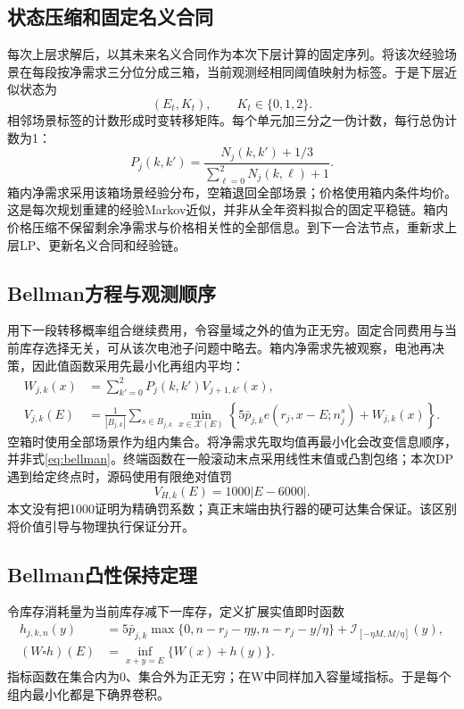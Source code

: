 \documentclass[UTF8,a4paper,zihao=-4,fontset=mac]{ctexart}
\newcommand{\I}{\mathcal I}
\begin{document}
\subsection{状态压缩和固定名义合同}
每次上层求解后，以其未来名义合同作为本次下层计算的固定序列。将该次经验场景在每段按净需求三分位分成三箱，当前观测经相同阈值映射为标签。于是下层近似状态为
\begin{equation}
 (E_t,K_t),\qquad K_t\in\{0,1,2\}.
\end{equation}
相邻场景标签的计数形成时变转移矩阵。每个单元加三分之一伪计数，每行总伪计数为1：
\begin{equation}\label{eq:transition}
 P_j(k,k')=\frac{N_j(k,k')+1/3}{\sum_{\ell=0}^2N_j(k,\ell)+1}.
\end{equation}
箱内净需求采用该箱场景经验分布，空箱退回全部场景；价格使用箱内条件均价。这是每次规划重建的经验Markov近似，并非从全年资料拟合的固定平稳链。箱内价格压缩不保留剩余净需求与价格相关性的全部信息。到下一合法节点，重新求上层LP、更新名义合同和经验链。

\subsection{Bellman方程与观测顺序}
用下一段转移概率组合继续费用，令容量域之外的值为正无穷。固定合同费用与当前库存选择无关，可从该次电池子问题中略去。箱内净需求先被观察，电池再决策，因此值函数采用先最小化再组内平均：
\begin{align}
 W_{j,k}(x)&=\sum_{k'=0}^2P_j(k,k')V_{j+1,k'}(x),\label{eq:w}\\
 V_{j,k}(E)&=\frac1{|B_{j,k}|}\sum_{s\in B_{j,k}}
 \min_{x\in\mathcal X(E)}\left\{5\bar p_{j,k}e(r_j,x-E;n_j^s)+W_{j,k}(x)\right\}.
 \label{eq:bellman}
\end{align}
空箱时使用全部场景作为组内集合。将净需求先取均值再最小化会改变信息顺序，并非式\eqref{eq:bellman}。终端函数在一般滚动末点采用线性末值或凸割包络；本次DP遇到给定终点时，源码使用有限绝对值罚
\begin{equation}\label{eq:penalty}
 V_{H,k}(E)=1000|E-6000|.
\end{equation}
本文没有把1000证明为精确罚系数；真正末端由执行器的硬可达集合保证。该区别将价值引导与物理执行保证分开。

\subsection{Bellman凸性保持定理}
令库存消耗量为当前库存减下一库存，定义扩展实值即时函数
\begin{equation}\label{eq:convolution}
\begin{aligned}
 h_{j,k,n}(y)&=5\bar p_{j,k}\max\{0,n-r_j-\eta y,n-r_j-y/\eta\}
             +\I_{[-\eta M,M/\eta]}(y),\\
 (W\square h)(E)&=\inf_{x+y=E}\{W(x)+h(y)\}.
\end{aligned}
\end{equation}
指标函数在集合内为0、集合外为正无穷；在W中同样加入容量域指标。于是每个组内最小化都是下确界卷积。
\end{document}
